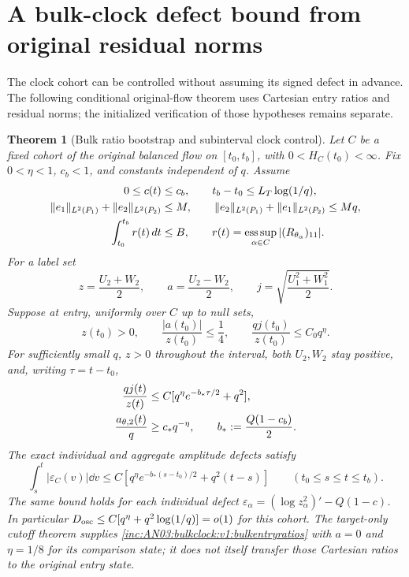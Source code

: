 \documentclass[11pt]{article}
\newtheorem{theorem}{Theorem}[section]
\theoremstyle{remark}\newtheorem{remark}[theorem]{Remark}
\begin{document}
\section{A bulk-clock defect bound from original residual norms}
The clock cohort can be controlled without assuming its signed defect in advance. The following conditional original-flow theorem uses Cartesian entry ratios and residual norms; the initialized verification of those hypotheses remains separate.

\begin{theorem}[Bulk ratio bootstrap and subinterval clock control]
\label{inc:AN03:bulkclock:v1:bulkclockclosure}
Let $C$ be a fixed cohort of the original balanced flow on $[t_0,t_b]$, with $0<H_C(t_0)<\infty$. Fix $0<\eta<1$, $c_b<1$, and constants independent of $q$. Assume
\begin{align}
 0\le c(t)&\le c_b,\qquad t_b-t_0\le L_T\log(1/q),\notag\\
 \|e_1\|_{L^2(P_1)}+\|e_2\|_{L^2(P_2)}&\le M,\qquad
 \|e_2\|_{L^2(P_1)}+\|e_1\|_{L^2(P_2)}\le Mq,
 \label{inc:AN03:bulkclock:v1:bulkresiduals}\\
 \int_{t_0}^{t_b}r(t)\,d t&\le B,\qquad
 r(t)=\operatorname*{ess\,sup}_{\alpha\in C}|(R_{\theta_\alpha})_{11}|.
 \notag
\end{align}
For a label set
\[
 z=\frac{U_2+W_2}{2},\qquad a=\frac{U_2-W_2}{2},\qquad
 j=\sqrt{\frac{U_1^2+W_1^2}{2}}.
\]
Suppose at entry, uniformly over $C$ up to null sets,
\begin{equation}\label{inc:AN03:bulkclock:v1:bulkentryratios}
 z(t_0)>0,\qquad \frac{|a(t_0)|}{z(t_0)}\le\frac14,\qquad
 \frac{qj(t_0)}{z(t_0)}\le C_0q^\eta.
\end{equation}
For sufficiently small $q$, $z>0$ throughout the interval, both $U_2,W_2$ stay positive, and, writing $\tau=t-t_0$,
\begin{align}
 \frac{qj(t)}{z(t)}&\le C[q^\eta e^{-b_*\tau/2}+q^2],\notag\\
 \frac{a_{\theta,2}(t)}q&\ge c_*q^{-\eta},\qquad
 b_*:=\frac{Q(1-c_b)}2.
 \label{inc:AN03:bulkclock:v1:bulkratioconclusion}
\end{align}
The exact individual and aggregate amplitude defects satisfy
\begin{equation}\label{inc:AN03:bulkclock:v1:bulkdefectconclusion}
 \int_s^t|\varepsilon_C(v)|\dd v
 \le C\left[q^\eta e^{-b_*(s-t_0)/2}+q^2(t-s)\right]
 \qquad(t_0\le s\le t\le t_b).
\end{equation}
The same bound holds for each individual defect
$\varepsilon_\alpha=(\log z_\alpha^2)'-Q(1-c)$.
In particular $D_{\rm osc}\le C[q^\eta+q^2\log(1/q)]=o(1)$ for this cohort. The target-only cutoff theorem supplies \eqref{inc:AN03:bulkclock:v1:bulkentryratios} with $a=0$ and $\eta=1/8$ for its comparison state; it does not itself transfer those Cartesian ratios to the original entry state.
\end{theorem}
\end{document}
